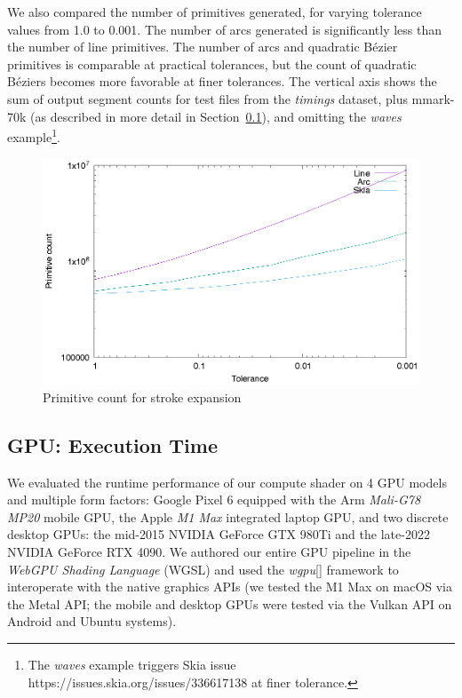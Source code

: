 \documentclass[sigconf]{acmart}
\begin{document}
We also compared the number of primitives generated, for varying tolerance values from 1.0 to 0.001. The number of arcs generated is significantly less than the number of line primitives. The number of arcs and quadratic Bézier primitives is comparable at practical tolerances, but the count of quadratic Béziers becomes more favorable at finer tolerances. The vertical axis shows the sum of output segment counts for test files from the \emph{timings} dataset, plus mmark-70k (as described in more detail in Section~\ref{subsection:gpu-results}), and omitting the \emph{waves} example\footnote{The \emph{waves} example triggers Skia issue https://issues.skia.org/issues/336617138 at finer tolerance.}.

\begin{figure}
    \includegraphics[scale=0.6]{prim_count}
    \caption{Primitive count for stroke expansion}
    \label{fig:prim_count}
\end{figure}

\subsection{GPU: Execution Time} \label{subsection:gpu-results}

We evaluated the runtime performance of our compute shader on 4 GPU models and multiple form factors: Google Pixel 6 equipped with the Arm \emph{Mali-G78 MP20} mobile GPU, the Apple \emph{M1 Max} integrated laptop GPU, and two discrete desktop GPUs: the mid-2015 NVIDIA {GeForce GTX 980Ti} and the late-2022 NVIDIA {GeForce RTX 4090}. We authored our entire GPU pipeline in the \emph{WebGPU Shading Language} (WGSL) and used the \emph{wgpu}[] framework to interoperate with the native graphics APIs (we tested the M1 Max on macOS via the Metal API; the mobile and desktop GPUs were tested via the Vulkan API on Android and Ubuntu systems).
\end{document}
